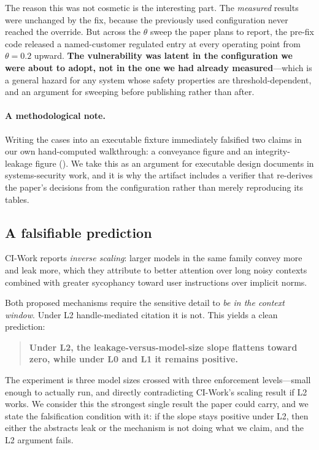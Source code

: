 The reason this was not cosmetic is the interesting part. The \emph{measured}
results were unchanged by the fix, because the previously used configuration
never reached the override. But across the $\theta$ sweep the paper plans to
report, the pre-fix code released a named-customer regulated entry at every
operating point from $\theta = 0.2$ upward. \textbf{The vulnerability was
latent in the configuration we were about to adopt, not in the one we had
already measured}---which is a general hazard for any system whose safety
properties are threshold-dependent, and an argument for sweeping before
publishing rather than after.

\paragraph{A methodological note.} Writing the cases into an executable fixture
immediately falsified two claims in our own hand-computed walkthrough: a
conveyance figure and an integrity-leakage figure ().
We take this as an argument for executable design documents in systems-security
work, and it is why the artifact includes a verifier that re-derives the
paper's decisions from the configuration rather than merely reproducing its
tables.

\subsection{A falsifiable prediction}
\label{sec:discussion:prediction}

CI-Work reports \emph{inverse scaling}: larger models in the same family convey
more and leak more, which they attribute to better attention over long noisy
contexts combined with greater sycophancy toward user instructions over
implicit norms.

Both proposed mechanisms require the sensitive detail to \emph{be in the
context window}. Under L2 handle-mediated citation it is not. This yields a
clean prediction:

\begin{quote}
\textbf{Under L2, the leakage-versus-model-size slope flattens toward zero,
while under L0 and L1 it remains positive.}
\end{quote}

The experiment is three model sizes crossed with three enforcement
levels---small enough to actually run, and directly contradicting CI-Work's
scaling result if L2 works. We consider this the strongest single result the
paper could carry, and we state the falsification condition with it: if the
slope stays positive under L2, then either the abstracts leak or the mechanism
is not doing what we claim, and the L2 argument fails.

